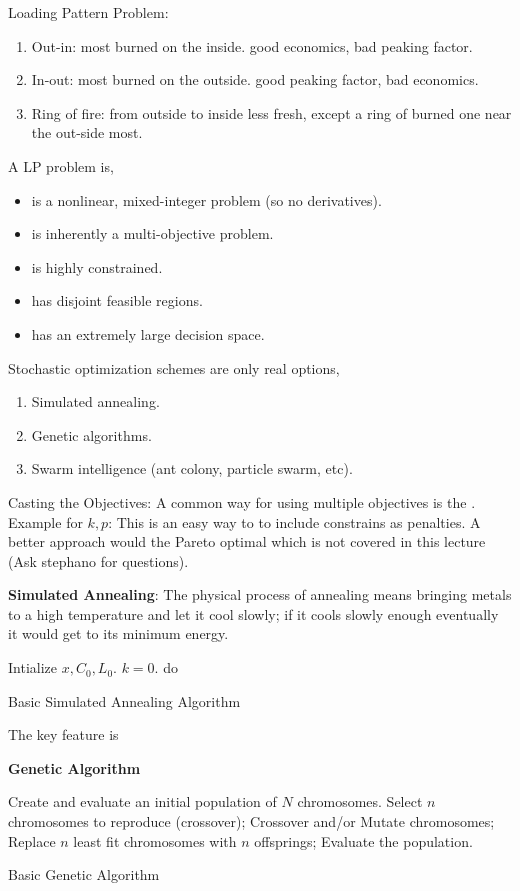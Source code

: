 \documentclass{school-22.211-notes}
\begin{document}
Loading Pattern Problem: 
\begin{enumerate}
\item Out-in: most burned on the inside. good economics, bad peaking factor. 
\item In-out: most burned on the outside. good peaking factor, bad economics.
\item Ring of fire: from outside to inside less fresh, except a ring of burned one near the out-side most. 
\end{enumerate}
A LP problem is, 
\begin{itemize}
\item is a nonlinear, mixed-integer problem (so no derivatives).
\item is inherently a multi-objective problem. 
\item is highly constrained. 
\item has disjoint feasible regions.
\item has an extremely large decision space. 
\end{itemize}
Stochastic optimization schemes are only real options, 
\begin{enumerate}
\item Simulated annealing.
\item Genetic algorithms.
\item Swarm intelligence (ant colony, particle swarm, etc). 
\end{enumerate}
Casting the Objectives: A common way for using multiple objectives is the . Example for $k, p$: 
This is an easy way to to include constrains as penalties. A better approach would the Pareto optimal which is not covered in this lecture (Ask stephano for questions). 

\textbf{Simulated Annealing}: The physical process of annealing means bringing metals to a high temperature and let it cool slowly; if it cools slowly enough eventually it would get to its minimum energy. 
\begin{algorithm}
  \begin{algorithmic}
    \STATE Intialize $x, C_0, L_0$.  $k=0$. 
    \STATE do 
    \ENDWHILE
  \end{algorithmic}
  \caption{Basic Simulated Annealing Algorithm}
\end{algorithm}
The key feature is 


\textbf{Genetic Algorithm}
\begin{algorithm}
  \begin{algorithmic}
    \STATE Create and evaluate an initial population of $N$ chromosomes.
    \STATE Select $n$ chromosomes to reproduce (crossover); 
    \STATE Crossover and/or Mutate chromosomes;
    \STATE Replace $n$ least fit chromosomes with $n$ offsprings;
    \STATE Evaluate the population.
    \ENDWHILE
  \end{algorithmic}
  \caption{Basic Genetic Algorithm}
\end{algorithm}
\end{document}
